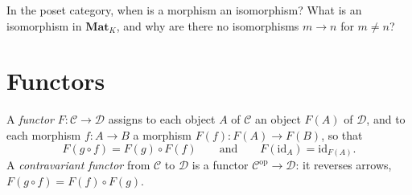 \begin{think}
In the poset category, when is a morphism an isomorphism? What is an isomorphism in $\mathbf{Mat}_K$, and why are there no isomorphisms $m\to n$ for $m\ne n$?
\end{think}

\section{Functors}

\begin{definition}\label{def:functor}
A \emph{functor} $F\colon\mathcal C\to\mathcal D$ assigns to each object $A$ of $\mathcal C$ an object $F(A)$ of $\mathcal D$, and to each morphism $f\colon A\to B$ a morphism $F(f)\colon F(A)\to F(B)$, so that
\[F(g\circ f)=F(g)\circ F(f)\qquad\text{and}\qquad F(\mathrm{id}_A)=\mathrm{id}_{F(A)}.\]
A \emph{contravariant functor} from $\mathcal C$ to $\mathcal D$ is a functor $\mathcal C^{\mathrm{op}}\to\mathcal D$: it reverses arrows, $F(g\circ f)=F(f)\circ F(g)$.
\end{definition}

